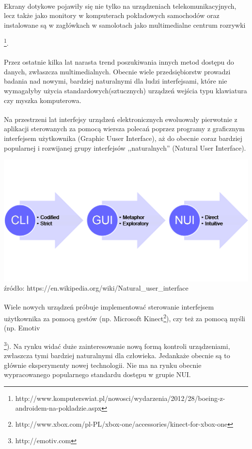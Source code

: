 \paragraph{}
Ekrany dotykowe pojawiły się nie tylko na urządzeniach telekomunikacyjnych, lecz także jako monitory w komputerach pokładowych samochodów oraz instalowane są w zagłówkach w samolotach jako multimedialne centrum rozrywki {\footnote{http://www.komputerswiat.pl/nowosci/wydarzenia/2012/28/boeing-z-androidem-na-pokladzie.aspx}.
\paragraph{}
Przez ostatnie kilka lat narasta trend poszukiwania innych metod dostępu do danych, zwłaszcza multimedialnych. Obecnie wiele przedsiębiorstw prowadzi badania nad nowymi, bardziej naturalnymi dla ludzi interfejsami, które nie wymagałyby użycia standardowych(sztucznych) urządzeń wejścia typu klawiatura czy myszka komputerowa.
\paragraph{}
Na przestrzeni lat interfejsy urządzeń elektronicznych ewoluowały pierwotnie z aplikacji sterowanych za pomocą wiersza polecań poprzez programy z graficznym interfejsem użytkownika (Graphic Uuser Interface), aż do obecnie coraz bardziej popularnej i rozwijanej grupy interfejsów ,,naturalnych'' (Natural User Interface).
\begin{center}
\includegraphics[width=1\textwidth]{images/nui.png}
\small {źródło: https://en.wikipedia.org/wiki/Natural\_user\_interface }
\end{center}
\paragraph{}
Wiele nowych urządzeń próbuje implementować sterowanie interfejsem użytkownika za pomocą gestów (np. Microsoft Kinect\footnote{http://www.xbox.com/pl-PL/xbox-one/accessories/kinect-for-xbox-one}), czy też za pomocą myśli (np. Emotiv{\footnote{http://emotiv.com}). Na rynku widać duże zainteresowanie nową formą kontroli urządzeniami, zwłaszcza tymi bardziej naturalnymi dla człowieka. Jedankaże obecnie są to głównie eksperymenty nowej technologii. Nie ma na rynku obecnie wypracowanego popularnego standardu dostępu w grupie NUI.

}}

